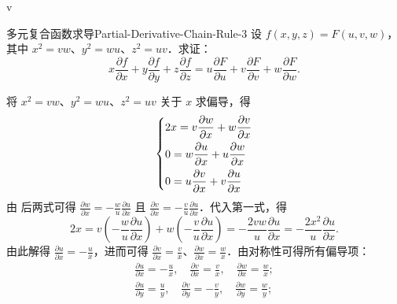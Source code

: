 v

\begin{problem}{多元复合函数求导}{Partial-Derivative-Chain-Rule-3}
    设 $f(x,y,z) = F(u,v,w)$，其中 $x^2 = vw$、$y^2 = wu$、$z^2 = uv$．求证：
    \begin{equation}
        x \frac{\partial f}{\partial x} + y \frac{\partial f}{\partial y} + z \frac{\partial f}{\partial z} = u \frac{\partial F}{\partial u} + v \frac{\partial F}{\partial v} + w \frac{\partial F}{\partial w}.
    \end{equation}
\end{problem}

\begin{myproof}
    将 $x^2 = vw$、$y^2 = wu$、$z^2 = uv$ 关于 $x$ 求偏导，得
    \begin{equation}
        \begin{dcases}
            2x = v \frac{\partial w}{\partial x} + w \frac{\partial v}{\partial x} \\
            0 = w \frac{\partial u}{\partial x} + u \frac{\partial w}{\partial x}  \\
            0 = u \frac{\partial v}{\partial x} + v \frac{\partial u}{\partial x}
        \end{dcases}
        \label{eq:differentiation-system}
    \end{equation}
    由  后两式可得 $\frac{\partial w}{\partial x} = -\frac{w}{u} \frac{\partial u}{\partial x}$ 且 $\frac{\partial v}{\partial x} = -\frac{v}{u} \frac{\partial u}{\partial x}$．代入第一式，得
    \begin{equation}
        2x = v \left( -\frac{w}{u} \frac{\partial u}{\partial x} \right) + w \left( -\frac{v}{u} \frac{\partial u}{\partial x} \right) = -\frac{2vw}{u} \frac{\partial u}{\partial x} = -\frac{2x^2}{u} \frac{\partial u}{\partial x}.
    \end{equation}
    由此解得 $\frac{\partial u}{\partial x} = -\frac{u}{x}$，进而可得 $\frac{\partial v}{\partial x} = \frac{v}{x}$、$\frac{\partial w}{\partial x} = \frac{w}{x}$．由对称性可得所有偏导项：
    \begin{equation}
        \begin{aligned}
            \frac{\partial u}{\partial x} = -\frac{u}{x}, \quad \frac{\partial v}{\partial x} = \frac{v}{x}, \quad \frac{\partial w}{\partial x} = \frac{w}{x}; \\
            \frac{\partial u}{\partial y} = \frac{u}{y}, \quad \frac{\partial v}{\partial y} = -\frac{v}{y}, \quad \frac{\partial w}{\partial y} = \frac{w}{y}; \\

\end{aligned}
\end{equation}
\end{myproof}
